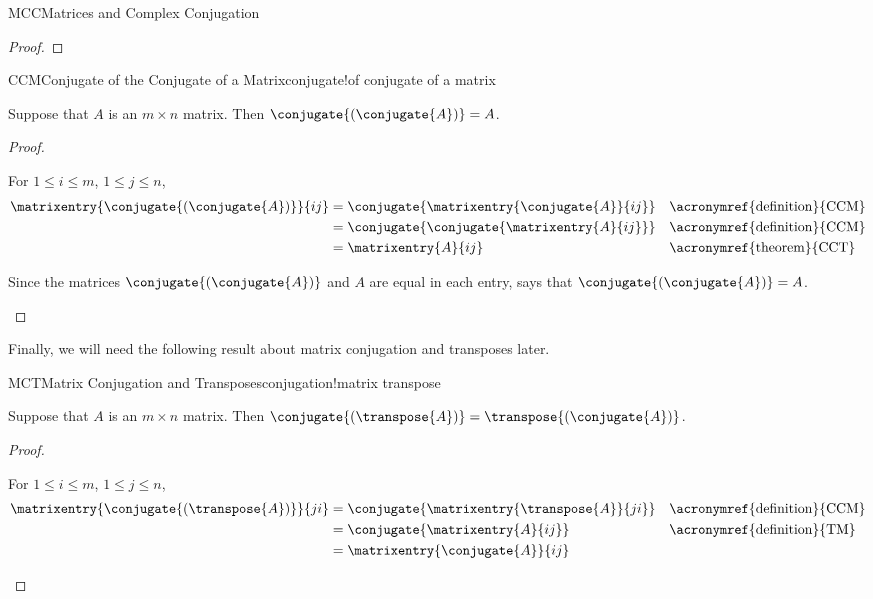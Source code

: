 \begin{subsect}{MCC}{Matrices and Complex Conjugation}
\begin{proof}
%
\end{proof}
%
%
\begin{theorem}{CCM}{Conjugate of the Conjugate of a Matrix}{conjugate!of conjugate of a matrix}
\begin{para}Suppose that $A$ is an $m\times n$ matrix.  Then $\conjugate{\left(\conjugate{A}\right)}=A$.\end{para}
\end{theorem}
%
\begin{proof}
\begin{para}For $1\leq i\leq m$, $1\leq j\leq n$,
%
\begin{align*}
%
\matrixentry{\conjugate{\left(\conjugate{A}\right)}}{ij}
&=\conjugate{\matrixentry{\conjugate{A}}{ij}}&&\text{\acronymref{definition}{CCM}}\\
&=\conjugate{\conjugate{\matrixentry{A}{ij}}}&&\text{\acronymref{definition}{CCM}}\\
&=\matrixentry{A}{ij}&&\text{\acronymref{theorem}{CCT}}%
\end{align*}
\end{para}
%
\begin{para}Since the matrices  $\conjugate{\left(\conjugate{A}\right)}$ and $A$  are equal in each entry,  says that $\conjugate{\left(\conjugate{A}\right)}=A$.\end{para}
%
\end{proof}
%
\begin{para}Finally, we will need the following result about matrix conjugation and transposes later.\end{para}
%
\begin{theorem}{MCT}{Matrix Conjugation and Transposes}{conjugation!matrix transpose}
\begin{para}Suppose that $A$ is an $m\times n$ matrix.  Then $\conjugate{\left(\transpose{A}\right)}=\transpose{\left(\conjugate{A}\right)}$.\end{para}
\end{theorem}
%
\begin{proof}
%
\begin{para}For $1\leq i\leq m$, $1\leq j\leq n$,
%
\begin{align*}
%
\matrixentry{\conjugate{\left(\transpose{A}\right)}}{ji}
%
&=\conjugate{\matrixentry{\transpose{A}}{ji}}
&&\text{\acronymref{definition}{CCM}}\\
%
&=\conjugate{\matrixentry{A}{ij}}
&&\text{\acronymref{definition}{TM}}\\
%
&=\matrixentry{\conjugate{A}}{ij}

\end{align*}
\end{para}
\end{proof}
\end{subsect}
